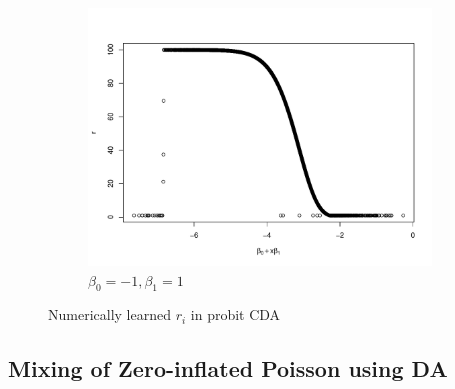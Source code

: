 \documentclass[10pt]{article}
\begin{document}
\begin{figure}[H]
 \centering
 \begin{subfigure}[b]{0.5\textwidth}
 \includegraphics[width=1\textwidth]{probit_ada_r.pdf}
 \caption{$\beta_0=-1, \beta_1=1$}
 \end{subfigure}
 \caption{Numerically learned $r_i$ in probit CDA}
 \end{figure}


\subsection{Mixing of Zero-inflated Poisson using DA}
\end{document}
